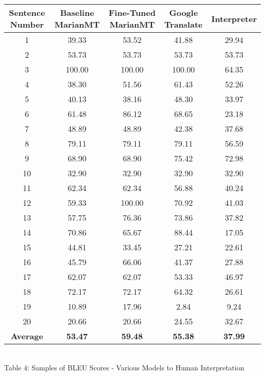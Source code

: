 \documentclass{article}
\begin{document}
\begingroup
\centering
\begin{tabular}{|c|c|c|c|c|}
\hline
Sentence Number & Baseline MarianMT & Fine-Tuned MarianMT & Google Translate & Interpreter\\
\hline
1 & 39.33 & 53.52 & 41.88 & 29.94 \\
2 & 53.73 & 53.73 & 53.73 & 53.73 \\
3 & 100.00 & 100.00 & 100.00 & 64.35 \\
4 & 38.30 & 51.56 & 61.43 & 52.26 \\
5 & 40.13 & 38.16 & 48.30 & 33.97 \\
6 & 61.48 & 86.12 & 68.65 & 23.18 \\
7 & 48.89 & 48.89 & 42.38 & 37.68 \\
8 & 79.11 & 79.11 & 79.11 & 56.59 \\
9 & 68.90 & 68.90 & 75.42 & 72.98 \\
10 & 32.90 & 32.90 & 32.90 & 32.90 \\
11 & 62.34 & 62.34 & 56.88 & 40.24 \\
12 & 59.33 & 100.00 & 70.92 & 41.03 \\
13 & 57.75 & 76.36 & 73.86 & 37.82 \\
14 & 70.86 & 65.67 & 88.44 & 17.05 \\
15 & 44.81 & 33.45 & 27.21 & 22.61 \\
16 & 45.79 & 66.06 & 41.37 & 27.88 \\
17 & 62.07 & 62.07 & 53.33 & 46.97 \\
18 & 72.17 & 72.17 & 64.32 & 26.61 \\
19 & 10.89 & 17.96 & 2.84 & 9.24 \\
20 & 20.66 & 20.66 & 24.55 & 32.67 \\
\hline
\textbf{Average} & \textbf{53.47} & \textbf{59.48} & \textbf{55.38} & \textbf{37.99}\\
\hline
\end{tabular}
\\
\caption{\small{Table 4: Samples of BLEU Scores - Various Models to Human Interpretation}}
\label{table:ta}
\endgroup

\pagebreak
\end{document}
